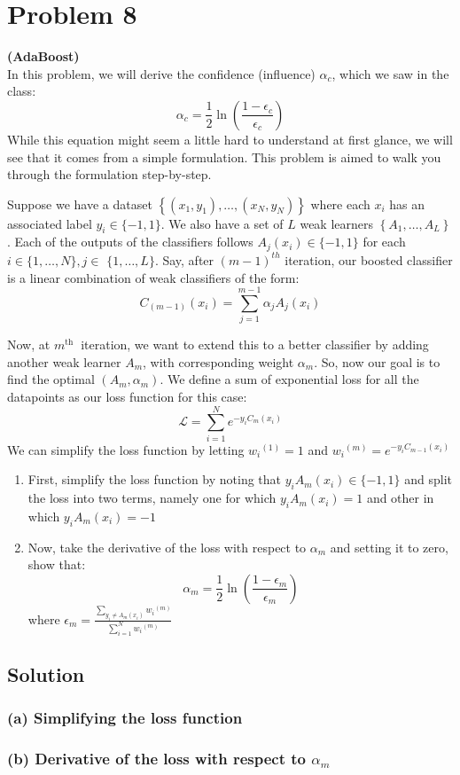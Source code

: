 \section*{Problem 8}

\textbf{(AdaBoost)}\\
In this problem, we will derive the confidence (influence) \( \alpha_{c} \), which we saw in the class:
\[
    \alpha_{c}=\frac{1}{2} \ln \left(\frac{1-\epsilon_{c}}{\epsilon_{c}}\right)
\]
While this equation might seem a little hard to understand at first glance, we will see that it comes from a simple formulation.
This problem is aimed to walk you through the formulation step-by-step.

Suppose we have a dataset \( \left \{\left(x_{1}, y_{1}\right), \ldots,\left(x_{N}, y_{N}\right)\right \} \) where each \( x_{i} \) has an associated label \( y_{i} \in \{-1,1\} \).
We also have a set of \( L \) weak learners \( \left \{A_{1}, \ldots, A_{L}\right \} \).
Each of the outputs of the classifiers follows \( A_{j}\left(x_{i}\right) \in \{-1,1\} \) for each \( i \in \{1, \ldots, N\}, j \in \) \( \{1, \ldots, L\} \).
Say, after \( (m-1)^{t h} \) iteration, our boosted classifier is a linear combination of weak classifiers of the form:
\[
    C_{(m-1)}\left(x_{i}\right)=\sum_{j=1}^{m-1} \alpha_{j} A_{j}\left(x_{i}\right)
\]

Now, at \( m^{\text {th }} \) iteration, we want to extend this to a better classifier by adding another weak learner \( A_{m} \), with corresponding weight \( \alpha_{m} \).
So, now our goal is to find the optimal \( \left(A_{m}, \alpha_{m}\right) \).
We define a sum of exponential loss for all the datapoints as our loss function for this case:
\[
    \mathcal{L}=\sum_{i=1}^{N} e^{-y_{i} C_{m}\left(x_{i}\right)}
\]
We can simplify the loss function by letting \( w_{i}{ }^{(1)}=1 \) and \( w_{i}{ }^{(m)}=e^{-y_{i} C_{m-1}\left(x_{i}\right)} \)
\begin{enumerate}[label= (\alph*), noitemsep, topsep=0pt]
    \item First, simplify the loss function by noting that \( y_{i} A_{m}\left(x_{i}\right) \in\{-1,1\} \) and split the loss into two terms, namely one for which \( y_{i} A_{m}\left(x_{i}\right)=1 \) and other in which \( y_{i} A_{m}\left(x_{i}\right)=-1 \)

    \item Now, take the derivative of the loss with respect to \( \alpha_{m} \) and setting it to zero, show that:
          \[
              \alpha_{m}=\frac{1}{2} \ln \left(\frac{1-\epsilon_{m}}{\epsilon_{m}}\right)
          \]
          where \( \epsilon_{m}=\frac{\sum_{y_{i} \neq A_{m}\left(x_{i}\right)} w_{i}{ }^{(m)}}{\sum_{i=1}^{N} w_{i}{ }^{(m)}} \)
\end{enumerate}

\subsection*{Solution}

\subsubsection*{(a) Simplifying the loss function}

\subsubsection*{(b) Derivative of the loss with respect to \( \alpha_{m} \)}
